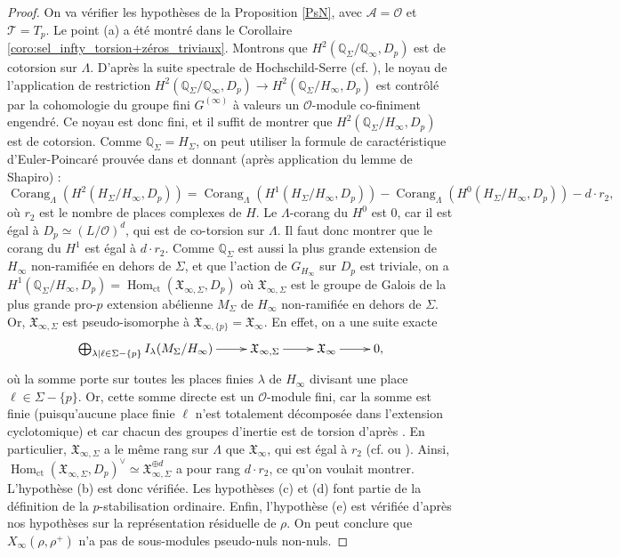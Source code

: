 \documentclass[12pt]{amsart}
\newcommand\bQ{\mathbb{Q}}
\newcommand\cA{\mathcal{A}}
\newcommand\cO{\mathcal{O}}
\newcommand\cT{\mathcal{T}}
\newcommand\gX{\mathfrak{X}}
\DeclareMathOperator{\Hom}{Hom}
\DeclareMathOperator{\corg}{Corang}
\theoremstyle{defstyle}
\theoremstyle{thmstyle}
\begin{document}
\begin{proof}
	On va vérifier les hypothèses de la Proposition \ref{PsN}, avec $\cA=\cO$ et $\cT=T_p$. Le point (a) a été montré dans le Corollaire \ref{coro:sel_infty_torsion+zéros_triviaux}. Montrons que $H^2(\bQ_\Sigma/\bQ_\infty,D_p)$ est de cotorsion sur $\Lambda$. D'après la suite spectrale de Hochschild-Serre (cf. \cite[Chap. 2, §4, Theorem 1]{neukirchcohomology}), le noyau de l'application de restriction $H^2(\bQ_\Sigma/\bQ_\infty,D_p) \longrightarrow H^2(\bQ_\Sigma/H_\infty,D_p)$ est contrôlé par la cohomologie du groupe fini $G^{(\infty)}$ à valeurs un $\cO$-module co-finiment engendré. Ce noyau est donc fini, et il suffit de montrer que $H^2(\bQ_\Sigma/H_\infty,D_p)$ est de cotorsion. Comme $\bQ_\Sigma=H_\Sigma$, on peut utiliser la formule de caractéristique d'Euler-Poincaré prouvée dans \cite[Proposition 4.1]{greenberg2006structure} et donnant (après application du lemme de Shapiro) :
	$$\corg_\Lambda \left( H^2(H_\Sigma/H_\infty,D_p)\right) = \corg_\Lambda  \left(H^1(H_\Sigma/H_\infty,D_p)\right) - \corg_\Lambda  \left(H^0(H_\Sigma/H_\infty,D_p)\right) -d \cdot r_2,$$
	où $r_2$ est le nombre de places complexes de $H$. Le $\Lambda$-corang du $H^0$ est 0, car il est égal à $D_p\simeq (L/\cO)^d$, qui est de co-torsion sur $\Lambda$. Il faut donc montrer que le corang du $H^1$ est égal à $d \cdot r_2$. Comme $\bQ_\Sigma$ est aussi la plus grande extension de $H_\infty$ non-ramifiée en dehors de $\Sigma$, et que l'action de $G_{H_\infty}$ sur $D_p$ est triviale, on a $H^1(\bQ_\Sigma/H_\infty,D_p)=\Hom_\textrm{ct}(\gX_{\infty,\Sigma},D_p)$ où $\gX_{\infty,\Sigma}$ est le groupe de Galois de la plus grande pro-$p$ extension abélienne $M_\Sigma$ de $H_\infty$ non-ramifiée en dehors de $\Sigma$. Or, $\gX_{\infty,\Sigma}$ est pseudo-isomorphe à $\gX_{\infty,\{p\}}=\gX_\infty$. En effet, on a une suite exacte 
	$$\xymatrix{\bigoplus_{\lambda|\ell\in\Sigma-\{p\}}I_\lambda(M_{\Sigma}/H_\infty)\ar[r] & \gX_{\infty,\Sigma}\ar[r] &\gX_{\infty} \ar[r] & 0,
	}
	$$
     où la somme porte sur toutes les places finies $\lambda$ de $H_\infty$ divisant une place $\ell\in\Sigma-\{p\}$. Or, cette somme directe est un $\cO$-module fini, car la somme est finie (puisqu'aucune place finie $\ell$ n'est totalement décomposée dans l'extension cyclotomique) et car chacun des groupes d'inertie est de torsion d'après \cite[Theorem 25]{iwasawa1973zl}. En particulier, $\gX_{\infty,\Sigma}$ a le même rang sur $\Lambda$ que $\gX_\infty$, qui est égal à $r_2$ (cf. \cite[Theorem 17]{iwasawa1973zl} ou \cite[Theorem 13.31]{washington1997introduction}).
	 Ainsi, $\Hom_\textrm{ct}(\gX_{\infty,\Sigma},D_p)^\vee \simeq \gX_{\infty,\Sigma}^{\oplus d}$ a pour rang $d \cdot r_2$, ce qu'on voulait montrer. L'hypothèse (b) est donc vérifiée. Les hypothèses (c) et (d) font partie de la définition de la $p$-stabilisation ordinaire. Enfin, l'hypothèse (e) est vérifiée d'après nos hypothèses sur la représentation résiduelle de $\rho$. On peut conclure que $X_\infty(\rho,\rho^+)$ n'a pas de sous-modules pseudo-nuls non-nuls.
\end{proof}
\end{document}

